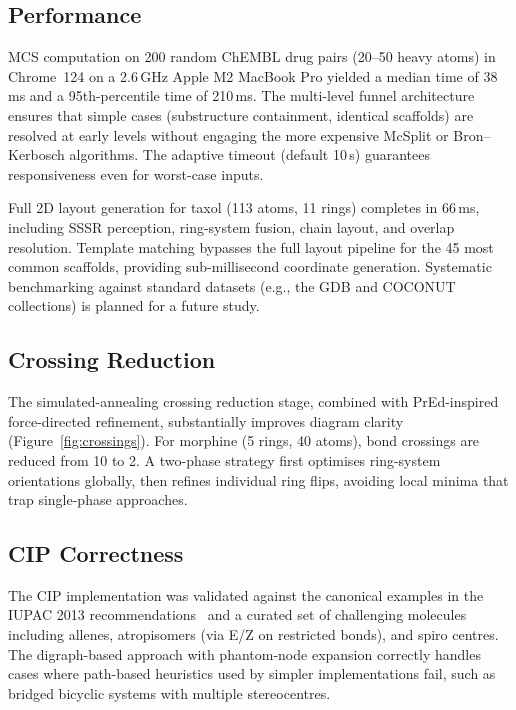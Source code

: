 \documentclass[twocolumn]{article}
\begin{document}
\subsection{Performance}

MCS computation on 200 random ChEMBL drug pairs (20--50 heavy atoms)
in Chrome~124 on a 2.6\,GHz Apple M2 MacBook Pro yielded a median time
of 38\,ms and a 95th-percentile time of 210\,ms.  The multi-level
funnel architecture ensures that simple cases (substructure containment,
identical scaffolds) are resolved at early levels without engaging the
more expensive McSplit or Bron--Kerbosch algorithms.  The adaptive
timeout (default 10\,s) guarantees responsiveness even for worst-case
inputs.

Full 2D layout generation for taxol (113 atoms, 11 rings) completes in
66\,ms, including SSSR perception, ring-system fusion, chain layout,
and overlap resolution.  Template matching bypasses the full layout
pipeline for the 45 most common scaffolds, providing sub-millisecond
coordinate generation.  Systematic benchmarking against standard
datasets (e.g., the GDB and COCONUT collections) is planned for a
future study.

\subsection{Crossing Reduction}

The simulated-annealing crossing reduction stage, combined with
PrEd-inspired force-directed refinement, substantially improves diagram
clarity (Figure~\ref{fig:crossings}).  For morphine (5 rings, 40 atoms),
bond crossings are reduced from 10 to 2.  A two-phase strategy first
optimises ring-system orientations globally, then refines individual
ring flips, avoiding local minima that trap single-phase approaches.

\subsection{CIP Correctness}

The CIP implementation was validated against the canonical examples in
the IUPAC 2013 recommendations~\citep{Favre2013} and a curated set of
challenging molecules including allenes, atropisomers (via E/Z on
restricted bonds), and spiro centres.  The digraph-based approach with
phantom-node expansion correctly handles cases where path-based
heuristics used by simpler implementations fail, such as bridged
bicyclic systems with multiple stereocentres.
\end{document}
